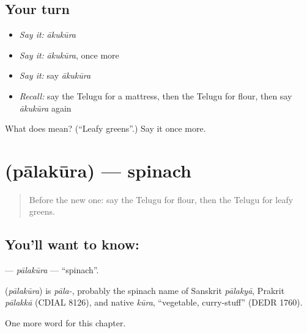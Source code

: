 \subsection*{Your turn}
\begin{itemize}
\raggedright
  \item \emph{Say it:} \emph{ākukūra}
  \item \emph{Say it:} \emph{ākukūra}, once more
  \item \emph{Say it:} say \emph{ākukūra}
  \item \emph{Recall:} say the Telugu for a mattress, then the Telugu for flour, then say \emph{ākukūra} again
\end{itemize}

\begin{tcolorbox}[breakable,colback=teal!4,colframe=teal!35!black,title={Before you move on}]
What does  mean? (\textquotedblleft{}Leafy greens\textquotedblright{}.) Say it once more.
\end{tcolorbox}
\section[\texorpdfstring{\te{పాలకూర} (pālakūra)}{పాలకూర (pālakūra)}]{ (pālakūra) — spinach}

\label{lesson:TE-C225-palakura}



\begin{quote}
Before the new one: say the Telugu for flour, then the Telugu for leafy greens.
\end{quote}

\subsection*{You'll want to know: }
\textbf{} — \emph{pālakūra} — \textquotedblleft{}spinach\textquotedblright{}.

\begin{cousinweb}
\textbf{} (\emph{pālakūra}) is \emph{pāla-}, probably the spinach name of Sanskrit \emph{pālakyā}, Prakrit \emph{pālakkā} (CDIAL 8126), and native \emph{kūra}, \textquotedblleft{}vegetable, curry-stuff\textquotedblright{} (DEDR 1760).
\end{cousinweb}

\begin{grammarlens}[title={What you've built}]
One more word for this chapter.
\end{grammarlens}

